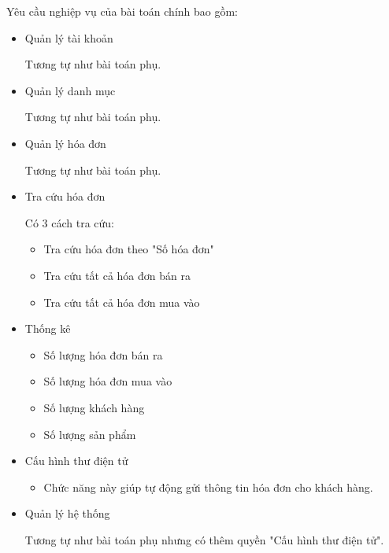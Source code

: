 Yêu cầu nghiệp vụ của bài toán chính bao gồm:

\begin{itemize}

    \item Quản lý tài khoản

          Tương tự như bài toán phụ.

    \item Quản lý danh mục

          Tương tự như bài toán phụ.

    \item Quản lý hóa đơn

          Tương tự như bài toán phụ.

    \item Tra cứu hóa đơn

          Có 3 cách tra cứu:

          \begin{itemize}

              \item Tra cứu hóa đơn theo "Số hóa đơn"

              \item Tra cứu tất cả hóa đơn bán ra

              \item Tra cứu tất cả hóa đơn mua vào

          \end{itemize}

    \item Thống kê

          \begin{itemize}

              \item Số lượng hóa đơn bán ra

              \item Số lượng hóa đơn mua vào

              \item Số lượng khách hàng

              \item Số lượng sản phẩm

          \end{itemize}

    \item Cấu hình thư điện tử
          \begin{itemize}

              \item Chức năng này giúp tự động gửi thông tin hóa đơn cho khách hàng.
          \end{itemize}


    \item Quản lý hệ thống

          Tương tự như bài toán phụ  nhưng có thêm quyền "Cấu    hình thư điện tử".

\end{itemize}